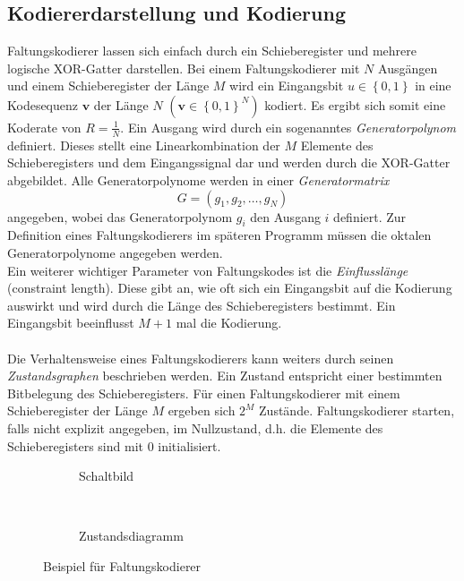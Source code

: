 \subsection{Kodiererdarstellung und Kodierung}
\label{kapitel:grundlagen_darstellung}
Faltungskodierer lassen sich einfach durch ein Schieberegister und mehrere logische XOR-Gatter darstellen. Bei einem Faltungskodierer mit $N$ Ausgängen und einem Schieberegister der Länge $M$ wird ein Eingangsbit $u \in \left\lbrace 0,1 \right\rbrace$ in eine Kodesequenz $\mathbf{v}$ der Länge $N$ $\left( \mathbf{v} \in {\left\lbrace 0,1\right\rbrace }^{N}\right)$ kodiert. Es ergibt sich somit eine Koderate von $R=\frac{1}{N}$. Ein Ausgang wird durch ein sogenanntes \emph{Generatorpolynom} definiert. Dieses stellt eine Linearkombination der $M$ Elemente des Schieberegisters und dem Eingangssignal dar und werden durch die XOR-Gatter abgebildet. Alle Generatorpolynome werden in einer \emph{Generatormatrix}
\begin{equation}
G=\left( g_{1}, g_{2},\dots , g_{N} \right) 
\end{equation}
angegeben, wobei das Generatorpolynom $g_{i}$ den Ausgang $i$ definiert. Zur Definition eines Faltungskodierers im späteren Programm müssen die oktalen Generatorpolynome angegeben werden.
\\
Ein weiterer wichtiger Parameter von Faltungskodes ist die \emph{Einflusslänge} (constraint length). Diese gibt an, wie oft sich ein Eingangsbit auf die Kodierung auswirkt und wird durch die Länge des Schieberegisters bestimmt. Ein Eingangsbit beeinflusst $M+1$ mal die Kodierung.
\\
\\
Die Verhaltensweise eines Faltungskodierers kann weiters durch seinen \emph{Zustandsgraphen} beschrieben werden. Ein Zustand entspricht einer bestimmten Bitbelegung des Schieberegisters. Für einen Faltungskodierer mit einem Schieberegister der Länge $M$ ergeben sich $2^{M}$ Zustände. Faltungskodierer starten, falls nicht explizit angegeben, im Nullzustand, d.h. die Elemente des Schieberegisters sind mit 0 initialisiert.
\begin{figure}[t]
	\centering
	\begin{subfigure}{0.65\textwidth}
		\centering
		\resizebox{0.99\textwidth}{!}{%
			
		}
		\caption{Schaltbild}
	\end{subfigure}
	~ %
	\begin{subfigure}{0.3\textwidth}
		\centering
		\resizebox{0.99\textwidth}{!}{%
			
		}
		\caption{Zustandsdiagramm}
	\end{subfigure}
	\caption{Beispiel für Faltungskodierer}
	\label{abb:standardkodierer}
\end{figure}
